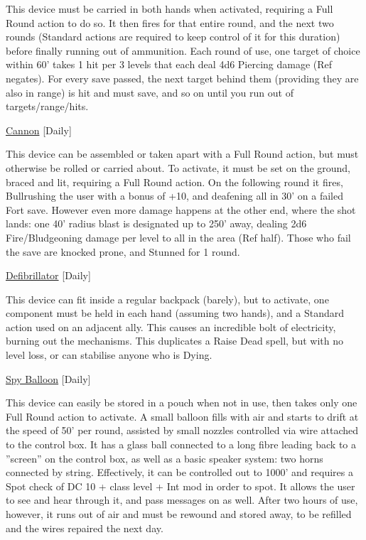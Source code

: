 \noindent This device must be carried in both hands when activated, requiring a Full Round action to do so. It then fires for that entire round, and the next two rounds (Standard actions are required to keep control of it for this duration) before finally running out of ammunition. Each round of use, one target of choice within 60' takes 1 hit per 3 levels that each deal 4d6 Piercing damage (Ref negates). For every save passed, the next target behind them (providing they are also in range) is hit and must save, and so on until you run out of targets/range/hits. 

\medskip\noindent\underline{Cannon} [Daily]
 
\noindent This device can be assembled or taken apart with a Full Round action, but must otherwise be rolled or carried about. To activate, it must be set on the ground, braced and lit, requiring a Full Round action. On the following round it fires, Bullrushing the user with a bonus of +10, and deafening all in 30' on a failed Fort save. However even more damage happens at the other end, where the shot lands: one 40' radius blast is designated up to 250' away, dealing 2d6 Fire/Bludgeoning damage per level to all in the area (Ref half). Those who fail the save are knocked prone, and Stunned for 1 round. 

\medskip\noindent\underline{Defibrillator} [Daily]
 
\noindent This device can fit inside a regular backpack (barely), but to activate, one component must be held in each hand (assuming two hands), and a Standard action used on an adjacent ally. This causes an incredible bolt of electricity, burning out the mechanisms. This duplicates a Raise Dead spell, but with no level loss, or can stabilise anyone who is Dying. 

\medskip\noindent\underline{Spy Balloon} [Daily]
 
\noindent This device can easily be stored in a pouch when not in use, then takes only one Full Round action to activate. A small balloon fills with air and starts to drift at the speed of 50' per round, assisted by small nozzles controlled via wire attached to the control box. It has a glass ball connected to a long fibre leading back to a ''screen'' on the control box, as well as a basic speaker system: two horns connected by string. Effectively, it can be controlled out to 1000' and requires a Spot check of DC 10 + class level + Int mod in order to spot. It allows the user to see and hear through it, and pass messages on as well. After two hours of use, however, it runs out of air and must be rewound and stored away, to be refilled and the wires repaired the next day. 

